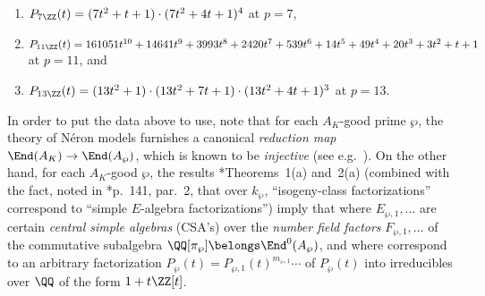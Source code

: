 \documentclass[12pt]{report}
\begin{document}
{\begin{enumerate}[(1)]
    \item $P_{7\ZZ}(t)
    = (7t^2+t+1)\cdot
    (7t^2+4t+1)^4$
    at $p=7$,
    
    \item $P_{11\ZZ}(t)
    = 161051t^{10} + 14641t^{9} + 3993t^{8} + 2420t^{7} + 539t^{6}
    + 14t^{5} + 49t^{4} + 20t^{3} + 3t^{2} + t + 1$
    at $p=11$,
    and
    
    \item $P_{13\ZZ}(t)
    = (13t^{2} + 1) \cdot
    (13t^{2} + 7t + 1) \cdot
    (13t^{2} + 4t + 1)^{3}$
    at $p=13$.
\end{enumerate}

In order to put the data above to use,
note that
for each $A_K$-good prime $\wp$,
the theory of N\'{e}ron models furnishes
a canonical \emph{reduction map}
$\End(A_K)\to\End(A_\wp)$,
which is known to be \emph{injective} (see e.g.~\cite{HuismanMSE1834526End_reduction_map}).
On the other hand,
for each $A_K$-good $\wp$,
the results
\cite{tate1966endomorphisms}*{Theorems~1(a) and~2(a)}
(combined with the fact,
noted in \cite{tate1966endomorphisms}*{p.~141, par.~2},
that over $k_\wp$,
``isogeny-class factorizations'' correspond to ``simple $E$-algebra factorizations'')
imply that
where $E_{\wp,1},\dots$ are certain \emph{central simple algebras} (CSA's) over the \emph{number field factors} $F_{\wp,1},\dots$ of the commutative subalgebra $\QQ[\pi_\wp]\belongs\End^0(A_\wp)$,
and where
correspond to an arbitrary factorization $P_\wp(t)=P_{\wp,1}(t)^{m_{\wp,1}}\cdots$ of $P_\wp(t)$ into irreducibles over $\QQ$ of the form $1+t\ZZ[t]$.

}
\end{document}
